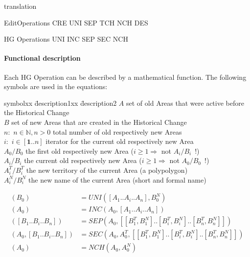 translation

EditOperations   CRE   UNI   SEP   TCH   NCH   DES

HG Operations     UNI   INC   SEP   SEC   NCH

\paragraph{Functional description} %
\label{par:functional_description}

Each HG Operation can be described by a mathematical function. The following symbols are used in the equations:

\begin{addmargin}[1em]{0em}
\begin{tabbing}
  symbolxx \= description1xx \= description2 \kill
  $A$ \> set of old Areas that were active before the Historical Change \\
  $B$ \> set of new Areas that are created in the Historical Change \\
  $n:$ \> $n \in \mathbb{N}, n>0$ \> total number of old respectively new Areas \\
  $i:$ \> $i \in [\textbf{1} .. n]$ \> iterator for the current old respectively new Area \\
  $A_0/B_0$ \>    the first old respectively new Area ($i \geq 1 \Rightarrow$ not $A_i/B_i$~!) \\
  $A_i/B_i$ \>    the current old respectively new Area ($i \geq 1 \Rightarrow$ not $A_0/B_0$~!) \\
  $A_i^T/B_i^T$ \>the new territory of the current Area (a polypolygon) \\
  $A_i^N/B_i^N$ \>the new name of the current Area (short and formal name) \\
\end{tabbing}
\end{addmargin}

\vspace{-2.5em}
\begin{align*}
  (B_0)                       &= UNI([A_1 .. A_i .. A_n], B_0^N) \\
  (A_0)                       &= INC(A_0, [A_1 .. A_i .. A_n]) \\
  ([B_1 .. B_i .. B_n])       &= SEP(A_0, [[B_1^T, B_1^N] .. [B_i^T, B_i^N] .. [B_n^T, B_n^N]]) \\
  (A_0, [B_1 .. B_i .. B_n])  &= SEC(A_0, A_0^T, [[B_1^T, B_1^N] .. [B_i^T, B_i^N] .. [B_n^T, B_n^N]]) \\
  (A_0)                       &= NCH(A_0, A_0^N)
\end{align*}

